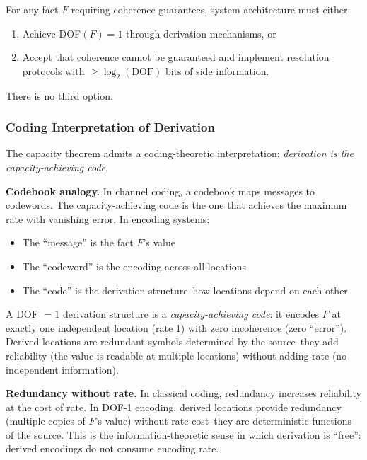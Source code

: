 \begin{corollary}\label{cor:architectural-forcing}
For any fact $F$ requiring coherence guarantees, system architecture must either:
\begin{enumerate}
\tightlist
\item Achieve DOF$(F) = 1$ through derivation mechanisms, or
\item Accept that coherence cannot be guaranteed and implement resolution protocols with $\geq \log_2(\text{DOF})$ bits of side information.
\end{enumerate}
There is no third option.
\end{corollary}

\subsubsection{Coding Interpretation of Derivation}

The capacity theorem admits a coding-theoretic interpretation: \emph{derivation is the capacity-achieving code}.

\textbf{Codebook analogy.} In channel coding, a codebook maps messages to codewords. The capacity-achieving code is the one that achieves the maximum rate with vanishing error. In encoding systems:
\begin{itemize}
\tightlist
\item The ``message'' is the fact $F$'s value
\item The ``codeword'' is the encoding across all locations
\item The ``code'' is the derivation structure--how locations depend on each other
\end{itemize}

A DOF $= 1$ derivation structure is a \emph{capacity-achieving code}: it encodes $F$ at exactly one independent location (rate 1) with zero incoherence (zero ``error''). Derived locations are redundant symbols determined by the source--they add reliability (the value is readable at multiple locations) without adding rate (no independent information).

\textbf{Redundancy without rate.} In classical coding, redundancy increases reliability at the cost of rate. In DOF-1 encoding, derived locations provide redundancy (multiple copies of $F$'s value) without rate cost--they are deterministic functions of the source. This is the information-theoretic sense in which derivation is ``free'': derived encodings do not consume encoding rate.

